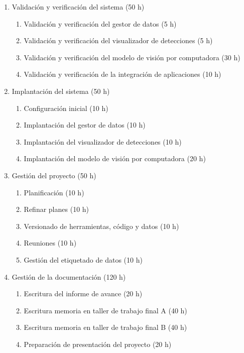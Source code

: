 \documentclass[
11pt, %
]{charter}
\begin{document}
\begin{enumerate}
  \item Validación y verificación del sistema (50 h)
        \begin{enumerate}
          \item Validación y verificación del gestor de datos (5 h)
          \item Validación y verificación del visualizador de detecciones (5 h)
          \item Validación y verificación del modelo de visión por computadora (30 h)
          \item Validación y verificación de la integración de aplicaciones (10 h)
        \end{enumerate}

  \item Implantación del sistema (50 h)
        \begin{enumerate}
          \item Configuración inicial (10 h)
          \item Implantación del gestor de datos (10 h)
          \item Implantación del visualizador de detecciones (10 h)
          \item Implantación del modelo de visión por computadora (20 h)
        \end{enumerate}

  \item Gestión del proyecto (50 h)
        \begin{enumerate}
          \item Planificación (10 h)
          \item Refinar planes (10 h)
          \item Versionado de herramientas, código y datos (10 h)
          \item Reuniones (10 h)
          \item Gestión del etiquetado de datos (10 h)
        \end{enumerate}

  \item Gestión de la documentación (120 h)
        \begin{enumerate}
          \item Escritura del informe de avance (20 h)
          \item Escritura memoria en taller de trabajo final A (40 h)
          \item Escritura memoria en taller de trabajo final B (40 h)
          \item Preparación de presentación del proyecto (20 h)
        \end{enumerate}

\end{enumerate}
\end{document}
